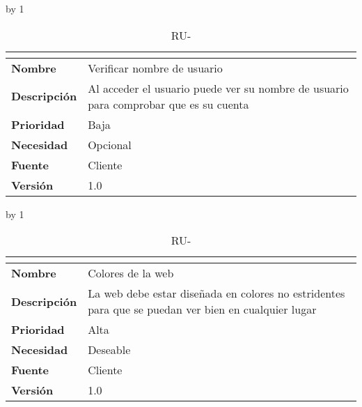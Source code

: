 \advance\ru by 1
\begin{table}[H]
	\caption{RU-\number\ru}
	\begin{tabular}{|l|p{}|}
		\hline
		\multicolumn{2}{|c|}{\cellcolor[HTML]{BFBFBF}{\color[HTML]{000000} \textbf{RU-\number\ru}}} \\ \hline
		\textbf{Nombre}      & Verificar nombre de usuario                                                          \\ \hline
		\textbf{Descripción} & Al acceder el usuario puede ver su nombre de usuario para comprobar que es su cuenta \\ \hline
		\textbf{Prioridad}   & Baja                                                                                 \\ \hline
		\textbf{Necesidad}   & Opcional                                                                             \\ \hline
		\textbf{Fuente}      & Cliente                                                                              \\ \hline
		\textbf{Versión}     & 1.0                                                                                  \\ \hline
	\end{tabular}
\end{table}
\advance\ru by 1
\begin{table}[H]
	\caption{RU-\number\ru}
	\begin{tabular}{|l|p{}|}
		\hline
		\multicolumn{2}{|c|}{\cellcolor[HTML]{BFBFBF}{\color[HTML]{000000} \textbf{RU-\number\ru}}} \\ \hline
		\textbf{Nombre}      & Colores de la web                                                                                   \\ \hline
		\textbf{Descripción} & La web debe estar diseñada en colores no estridentes para que se puedan ver bien en cualquier lugar \\ \hline
		\textbf{Prioridad}   & Alta                                                                                                \\ \hline
		\textbf{Necesidad}   & Deseable                                                                                            \\ \hline
		\textbf{Fuente}      & Cliente                                                                                             \\ \hline
		\textbf{Versión}     & 1.0                                                                                                 \\ \hline
	\end{tabular}
\end{table}
